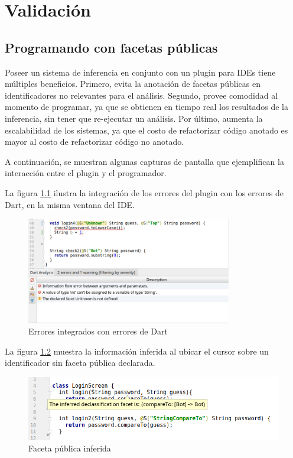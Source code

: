\chapter{Validación}

\section{Programando con facetas públicas}
Poseer un sistema de inferencia en conjunto con un plugin para IDEs tiene múltiples beneficios. Primero, evita la anotación de facetas públicas en identificadores no relevantes para el análisis. Segundo, provee comodidad al momento de programar, ya que se obtienen en tiempo real los resultados de la inferencia, sin tener que re-ejecutar un análisis. Por último, aumenta la escalabilidad de los sistemas, ya que el costo de refactorizar código anotado es mayor al costo de refactorizar código no anotado.

A continuación, se muestran algunas capturas de pantalla que ejemplifican la interacción entre el plugin y el programador.

La figura \ref{screen1} ilustra la integración de los errores del plugin con los errores de Dart, en la misma ventana del IDE.

\begin{figure}[ht]
  \centering
  \includegraphics[width=0.8\textwidth]{imagenes/screen1.png}
  \caption{Errores integrados con errores de Dart}
  \label{screen1}
\end{figure}
\clearpage

La figura \ref{screen2} muestra la información inferida al ubicar el cursor sobre un identificador sin faceta pública declarada.

\begin{figure}[ht]
  \includegraphics[width=\textwidth]{imagenes/facetinfo.png}
  \caption{Faceta pública inferida}
  \label{screen2}
\end{figure}


